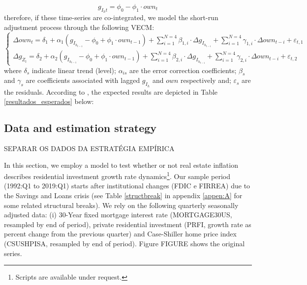 \begin{equation}
g_{I_ht} = \phi_0 - \phi_1\cdot own_t
\end{equation}
therefore, if these time-series are co-integrated, we model the short-run adjustment process through the following VECM:
\begin{equation}
\begin{cases}
\Delta own_t = \delta_{1} + \alpha_1\left(g_{I_{h_{t-1}}} - \phi_0 + \phi_1\cdot own_{t-1}\right) + {\sum^{N=4}_{i=1}}\beta_{1,i}\cdot \Delta g_{I_{h_{t-i}}} +
\sum^{N=4}_{i=1}\gamma_{1,i}\cdot \Delta own_{t-i} +\varepsilon_{t,1}
\\
\Delta g_{Z_{t}} = \delta_{2} + \alpha_2\left(g_{I_{h_{t-1}}} - \phi_0 + \phi_1\cdot own_{t-1}\right) + \sum^{N=4}_{i=1}\beta_{2,i}\cdot \Delta g_{I_{h_{t-i}}} +
\sum^{N=4}_{i=1}\gamma_{2,i}\cdot \Delta own_{t-i} +\varepsilon_{t,2}
\end{cases}
\end{equation}
where $\delta_s$ indicate linear trend (level);
$\alpha_{is}$ are the error correction coefficients; 
$\beta_s$ and $\gamma_s$ are coefficients associated with lagged $g_{I_h}$ and $own$ respectively and; $\varepsilon_s$ are the residuals.
According to \textcite{teixeira_crescimento_2015}, the expected results are depicted in Table \ref{resultados_esperados} below:




\subsection{Data and estimation strategy}\label{sec:estimation}

SEPARAR OS DADOS DA ESTRATÉGIA EMPÍRICA

In this section, we employ a model to test whether or not real estate inflation describes residential investment growth rate dynamics\footnote{Scripts are available under request.}. Our sample period (1992:Q1
to 2019:Q1) starts after institutional changes (FDIC e
FIRREA) due to the Savings and Loans crisis (see Table \ref{structbreak} in appendix \ref{appen:A} for some related structural breaks). 
We rely on the following  quarterly seasonally adjusted data: (i) 30-Year fixed mortgage interest rate (MORTGAGE30US, resampled by end of period), private residential investment (PRFI, growth rate as percent change from the previous quarter) and Case-Shiller home price index
(CSUSHPISA, resampled by end of period). Figure FIGURE shows the original series.



